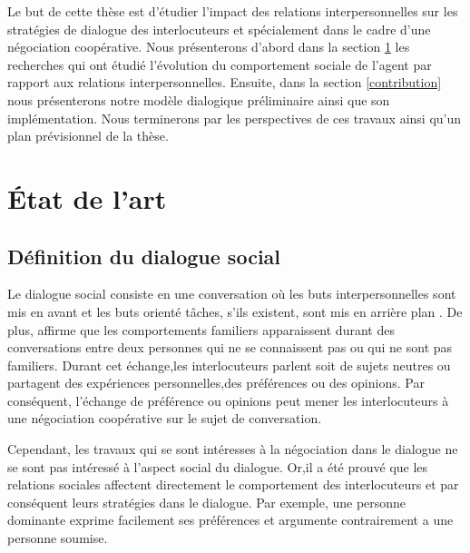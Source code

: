 \documentclass[a4paper,french]{article}
\begin{document}
\par Le but de cette thèse est d'étudier l'impact des relations interpersonnelles sur les stratégies de dialogue des interlocuteurs et spécialement dans le cadre d'une négociation coopérative. Nous présenterons d'abord dans la section \ref{RW} les recherches qui ont étudié l'évolution du comportement sociale de l'agent par rapport aux relations interpersonnelles. Ensuite, dans la section \ref{contribution} nous présenterons notre modèle dialogique préliminaire ainsi que son implémentation. Nous terminerons par les perspectives de ces travaux ainsi qu'un plan prévisionnel de la thèse.

\section{État de l'art}
\label{RW}

\subsection{Définition du dialogue social}
\par Le dialogue social consiste en une conversation où les buts interpersonnelles sont mis en avant et les buts orienté tâches, s'ils existent, sont mis en arrière plan \cite{bickmore2005social}. De plus, \cite{laver1981linguistic} affirme que les comportements familiers apparaissent durant des conversations entre deux personnes qui ne se connaissent pas ou qui ne sont pas familiers. Durant cet échange,les interlocuteurs parlent soit de sujets neutres ou partagent des expériences personnelles,des préférences ou des opinions. Par conséquent, l'échange de préférence ou opinions peut mener les interlocuteurs à une négociation coopérative sur le sujet de conversation.

\par Cependant, les travaux qui se sont intéresses à la négociation \cite{amgoud2000arguments,mcburney2004denotational,daskalopulu1998handling} dans le dialogue ne se sont pas intéressé à l'aspect social du dialogue. Or,il a été prouvé que les relations sociales affectent directement le comportement des interlocuteurs \cite{bickmore2000weather, bickmore2005establishing, moon1998intimate, nass2000does} et par conséquent leurs stratégies dans le dialogue. Par exemple, une personne dominante exprime facilement ses préférences et argumente contrairement a une personne soumise. 
\end{document}
